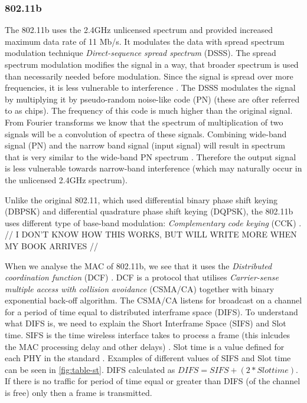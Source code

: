 \subsubsection{802.11b}
% 
The 802.11b uses the 2.4GHz unlicensed spectrum and provided increased maximum data rate of 11 Mb/s. It  modulates the data with spread spectrum modulation technique \emph{Direct-sequence spread spectrum} (DSSS). The spread spectrum modulation modifies the signal in a way, that broader spectrum is used than necessarily needed before modulation. Since the signal is spread over more frequencies, it is less vulnerable to interference \cite{MaximIntegratedProductsInc.2013AnMaxim}. The DSSS modulates the signal by multiplying it by pseudo-random  noise-like code (PN) (these are ofter referred to as chips). The frequency of this code is much higher than the original signal. From Fourier transforms we know that the spectrum of multiplication of two signals will be a convolution of spectra of these signals. Combining wide-band signal (PN) and the narrow band signal (input signal) will result in spectrum that is very similar to the wide-band PN spectrum \cite{Haykin2001CommunicationSystems}. Therefore the output signal is less vulnerable towards narrow-band interference (which may naturally occur in the unlicensed 2.4GHz spectrum).\par
% 
Unlike the original 802.11, which used differential binary phase shift keying (DBPSK) and differential quadrature phase shift keying (DQPSK), the 802.11b uses different type of base-band modulation: \emph{Complementary code keying} (CCK) \cite{2016IEEEAccess.} \cite{Aboul-Magd2008WirelessPerspective}. 
// I DON'T KNOW HOW THIS WORKS, BUT WILL WRITE MORE WHEN MY BOOK ARRIVES //\par
% 
When we analyse the MAC of 802.11b, we see that it uses the \emph{Distributed coordination function} (DCF) \cite{Hiertz2010TheUniverse}. DCF is a protocol that utilises \emph{Carrier-sense multiple access with collision avoidance} (CSMA/CA) together with binary exponential back-off algorithm. The CSMA/CA listens for broadcast on a channel for a period of time equal to distributed interframe space (DIFS). To understand what DIFS is, we need to explain the Short Interframe Space (SIFS) and Slot time. SIFS is the time wireless interface takes to process a frame (this inlcudes the MAC processing delay and other delays) \cite{2016IEEEAccess.}. Slot time is a value defined for each PHY in the standard \cite{2016IEEEAccess.}. Examples of different values of SIFS and Slot time can be seen in \ref{fig:table-st}. DIFS calculated as \(DIFS = SIFS + ( 2 * Slot time)\). If there is no traffic for period of time equal or greater than DIFS (of the channel is free) only then a frame is transmitted.\par
